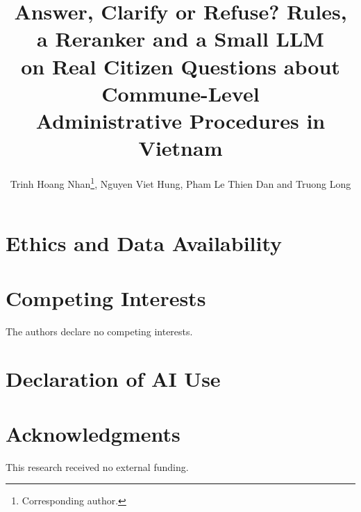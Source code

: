 \documentclass{ws-vjcs}
\begin{document}

\catchline{}{}{}{}{}

\title{Answer, Clarify or Refuse? Rules, a Reranker and a Small LLM\\
on Real Citizen Questions about Commune-Level\\
Administrative Procedures in Vietnam}

\author{Trinh Hoang Nhan\footnote{Corresponding author.}, Nguyen Viet Hung, Pham Le Thien Dan and Truong Long}

\address{Department of Artificial Intelligence, FPT University\\
Ho Chi Minh City, Vietnam\\
hoangnhan070206@gmail.com, hung2272006@gmail.com, phamlethiendan1@gmail.com, longt5@fpt.edu.vn}

\maketitle


\begin{abstract}

\end{abstract}










\section*{Ethics and Data Availability}


\section*{Competing Interests}
The authors declare no competing interests.

\section*{Declaration of AI Use}


\section*{Acknowledgments}
This research received no external funding.
\end{document}
